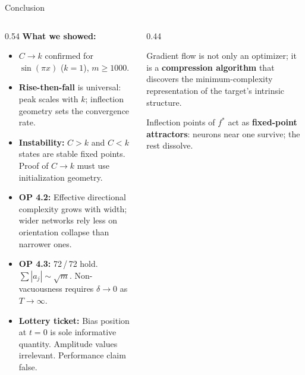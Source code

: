 \documentclass[aspectratio=169, 10pt]{beamer}
\newcommand{\fstar}{f^\ast}
\begin{document}
\begin{frame}{Conclusion}
  \begin{columns}[T]
    \begin{column}{0.54\textwidth}
      \footnotesize
      \textbf{What we showed:}
      \begin{itemize}\setlength{\itemsep}{0pt}\setlength{\parskip}{0pt}
        \item $C \to k$ confirmed for $\sin(\pi x)$ ($k=1$),
              $m \geq 1000$.
        \item \textbf{Rise-then-fall} is universal:
              peak scales with $k$; inflection geometry
              sets the convergence rate.
        \item \textbf{Instability:} $C > k$ and $C < k$ states are
              stable fixed points. Proof of $C \to k$
              must use initialization geometry.
        \item \textbf{OP 4.2:} Effective directional complexity
              grows with width; wider networks rely less on
              orientation collapse than narrower ones.
        \item \textbf{OP 4.3:}  72\,/\,72 hold. $\sum|a_j| \sim \sqrt{m}$.
      Non-vacuousness requires $\delta \to 0$ as $T \to \infty$.
        \item \textbf{Lottery ticket:}  Bias position at $t=0$ is sole informative quantity.
      Amplitude values irrelevant. Performance claim false.
      \end{itemize}
    \end{column}
    \begin{column}{0.44\textwidth}
      \begin{tcolorbox}[colback=aunavy!8, colframe=aunavy,
                        title={\small\textbf{Broader implication}},
                        top=2pt, bottom=2pt, left=4pt, right=4pt]
        \footnotesize
        Gradient flow is not only an optimizer;
        it is a \textbf{compression algorithm} that
        discovers the minimum-complexity representation
        of the target's intrinsic structure.

        \vspace{2pt}
        Inflection points of $\fstar$ act as
        \textbf{fixed-point attractors}: neurons near
        one survive; the rest dissolve.


\end{tcolorbox}
\end{column}
\end{columns}
\end{frame}
\end{document}
